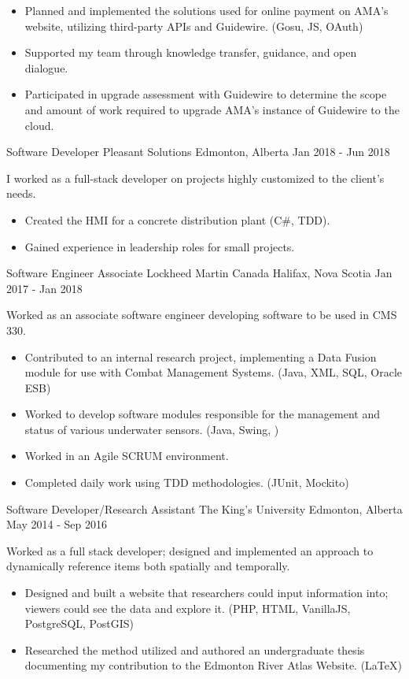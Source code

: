 \begin{cventries}
{\begin{itemize}
                \item Planned and implemented the solutions used for online payment on AMA’s website, utilizing third-party APIs and Guidewire. (Gosu, JS, OAuth)
                \item Supported my team through knowledge transfer, guidance, and open dialogue.
                \item Participated in upgrade assessment with Guidewire to determine the scope and amount of work required to upgrade AMA's instance of Guidewire to the cloud.
            \end{itemize}
        }
    \cventry
        {Software Developer}
        {Pleasant Solutions}
        {Edmonton, Alberta}
        {Jan 2018 - Jun 2018}
        {
            I worked as a full-stack developer on projects highly customized to the client’s needs.
            \begin{itemize}
                \item Created the HMI for a concrete distribution plant (C\#, TDD).
                \item Gained experience in leadership roles for small projects.
            \end{itemize}
        }
    \cventry
        {Software Engineer Associate}
        {Lockheed Martin Canada}
        {Halifax, Nova Scotia}
        {Jan 2017 - Jan 2018}
        {
            Worked as an associate software engineer developing software to be used in CMS 330.
            \begin{itemize}
                \item Contributed to an internal research project, implementing a Data Fusion module for use with Combat Management Systems. (Java, XML, SQL, Oracle ESB)
                \item Worked to develop software modules responsible for the management and status of various underwater sensors. (Java, Swing, )
                \item Worked in an Agile SCRUM environment.
                \item Completed daily work using TDD methodologies. (JUnit, Mockito)
            \end{itemize}
        }
    \cventry
        {Software Developer/Research Assistant}
        {The King's University}
        {Edmonton, Alberta}
        {May 2014 - Sep 2016}
        {
            Worked as a full stack developer; designed and implemented an approach to dynamically reference items both spatially and temporally.
            \begin{itemize}
                \item Designed and built a website that researchers could input information into; viewers could see the data and explore it. (PHP, HTML, VanillaJS, PostgreSQL, PostGIS)
                \item Researched the method utilized and authored an undergraduate thesis documenting my contribution to the Edmonton River Atlas
                Website. (\LaTeX)
            \end{itemize}
        }

\end{cventries}
